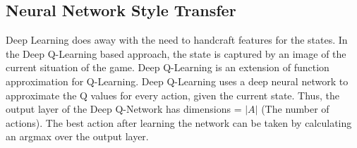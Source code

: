 \documentclass[10pt,twocolumn,letterpaper]{article}
\begin{document}
    
    
\subsection{Neural Network Style Transfer}
Deep Learning does away with the need to handcraft features for the states. In the Deep Q-Learning based approach, the state is captured by an image of the current situation of the game. %
Deep Q-Learning is an extension of function approximation for Q-Learning. Deep Q-Learning uses a deep neural network to approximate the Q values for every action, given the current state. Thus, the output layer of the Deep Q-Network has dimensions = $|A|$ (The number of actions). The best action after learning the network can be taken by calculating an argmax over the output layer. 
\end{document}
